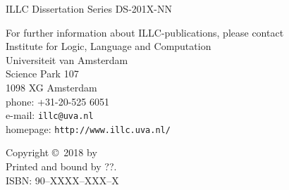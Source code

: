 
{\pagestyle{empty}

\makeatletter
\newcommand{\thetitle}{\@title}
\newcommand{\theauthor}{\@author}
\makeatother
\newcommand{\printtitle}{{\Huge\bf \thetitle}}

\begin{titlepage}
\par\vskip 2cm
\begin{center}
\printtitle
\vfill
{\LARGE\bf \theauthor}
\vskip 2cm
\end{center}
\end{titlepage}

\mbox{}\newpage
\setcounter{page}{1}

\par\vskip 2cm
\begin{center}
\printtitle
\end{center}

\clearpage
\par\vskip 2cm
\begin{center}
ILLC Dissertation Series DS-201X-NN                         %
\par\vspace {2cm}
\illclogo{10cm}
\par\vspace {2cm}
\noindent%
For further information about ILLC-publications, please contact\\[2ex]
Institute for Logic, Language and Computation\\
Universiteit van Amsterdam\\
Science Park 107\\
1098 XG Amsterdam\\
phone: +31-20-525 6051\\
e-mail: {\tt illc@uva.nl}\\
homepage: {\tt http://www.illc.uva.nl/}
\end{center}
\vfill

\noindent%
Copyright \copyright\ 2018 by \theauthor \\[2ex]
Printed and bound by ??.\\[2ex]                             %
ISBN: 90--XXXX--XXX--X                                      %

}
